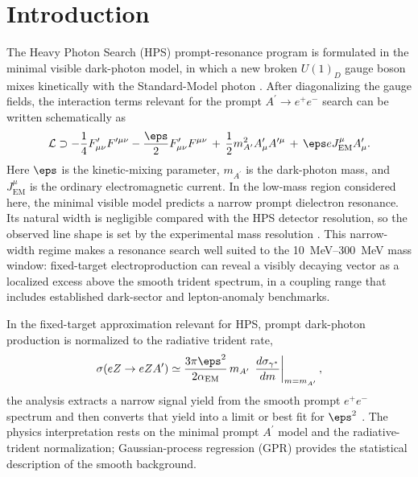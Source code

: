 \section{Introduction}
\label{sec:introduction}

The Heavy Photon Search (HPS) prompt-resonance program is formulated in the minimal
visible dark-photon model, in which a new broken $U(1)_D$ gauge boson mixes
kinetically with the Standard-Model photon \cite{Holdom1986,EssigEtAl2011}. After
diagonalizing the gauge fields, the interaction terms relevant for the prompt
$A^\prime \rightarrow e^+e^-$ search can be written schematically as
\begin{equation}
\mathcal{L}
\supset
-\frac{1}{4}F_{\mu\nu}^{\prime}F^{\prime\mu\nu}
-\frac{\eps}{2}F_{\mu\nu}^{\prime}F^{\mu\nu}
\,+\,\frac{1}{2}m_{A^\prime}^{2}A_\mu^\prime A^{\prime\mu}
\,+\,\eps e J_{\mathrm{EM}}^\mu A_\mu^\prime .
\label{eq:dark-photon-lagrangian}
\end{equation}
Here $\eps$ is the kinetic-mixing parameter, $m_{A^\prime}$ is the dark-photon mass,
and $J_{\mathrm{EM}}^\mu$ is the ordinary electromagnetic current. In the low-mass
region considered here, the minimal visible model predicts a narrow prompt dielectron
resonance. Its natural width is negligible compared with the HPS detector resolution,
so the observed line shape is set by the experimental mass resolution
\cite{HPS2015DarkPhoton,HPS2016PromptLong}. This narrow-width regime makes a resonance
search well suited to the \SIrange{10}{300}{MeV} mass window: fixed-target
electroproduction can reveal a visibly decaying vector as a localized excess above the
smooth trident spectrum, in a coupling range that includes established dark-sector and
lepton-anomaly benchmarks.

In the fixed-target approximation relevant for HPS, prompt dark-photon production is
normalized to the radiative trident rate,
\begin{equation}
\sigma(e Z \rightarrow e Z A^\prime)
\simeq
\frac{3\pi \eps^2}{2\alpha_{\mathrm{EM}}}\,
m_{A^\prime}\,
\left.\frac{d\sigma_{\gamma^\ast}}{dm}\right|_{m=m_{A^\prime}},
\label{eq:ap-production}
\end{equation}
the analysis extracts a narrow signal yield from the smooth prompt $e^+e^-$ spectrum
and then converts that yield into a limit or best fit for $\eps^2$
\cite{EssigEtAl2011,HPS2015DarkPhoton,HPS2016PromptLong}. The physics interpretation
rests on the minimal prompt $A^\prime$ model and the radiative-trident normalization;
Gaussian-process regression (GPR) provides the statistical description of the smooth
background.

